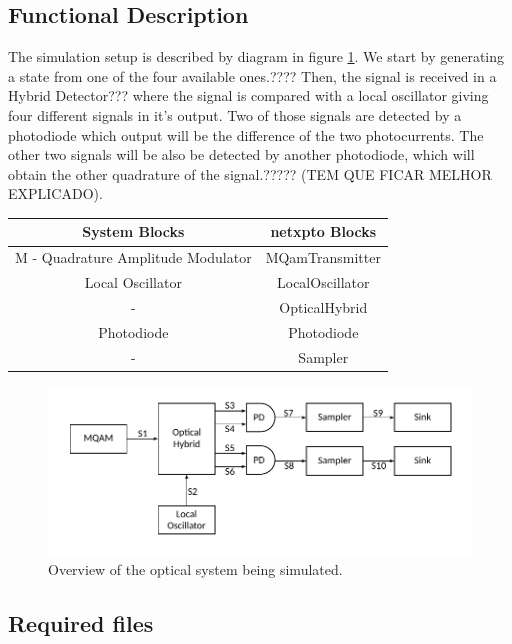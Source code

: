 \subsection*{Functional Description}

The simulation setup is described by diagram in figure \ref{fig:setup}. We start by generating a state from one of the four available ones.???? Then, the signal is received in a Hybrid Detector??? where the signal is compared with a local oscillator giving four different signals in it's output. Two of those signals are detected by a photodiode which output will be the difference of the two photocurrents. The other two signals will be also be detected by another photodiode, which will obtain the other quadrature of the signal.????? (TEM QUE FICAR MELHOR EXPLICADO).



\begin{table}[H]
\centering
\begin{tabular}{c|c}
System Blocks       & netxpto Blocks
\\ \hline
M - Quadrature Amplitude Modulator	& MQamTransmitter\\
Local Oscillator 	& LocalOscillator\\
- 					& OpticalHybrid\\
Photodiode			& Photodiode\\
- 					& Sampler\\
\end{tabular}
\end{table}


\begin{figure}[h]
\centering
\includegraphics[width=\linewidth]{./sdf/quantum_noise/figures/scheme1.pdf}
\caption{Overview of the optical system being simulated.}
\label{fig:setup}
\end{figure}


\subsection*{Required files}\label{Required files}

